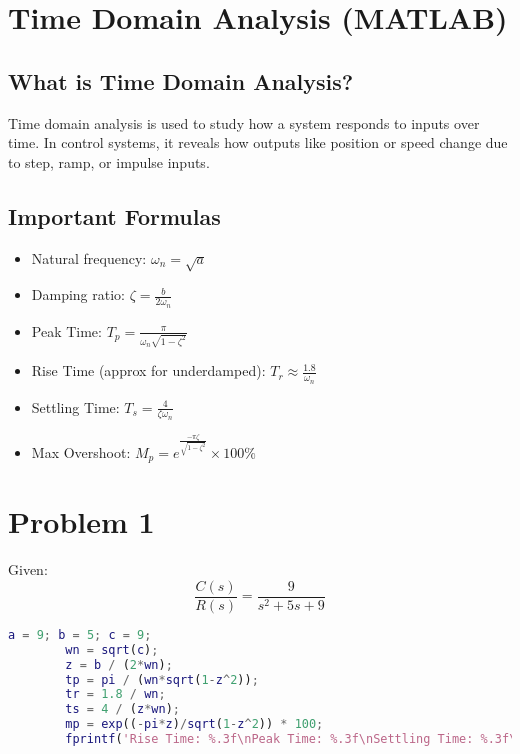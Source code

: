 \documentclass{article}
\begin{document}
	
	\section*{Time Domain Analysis (MATLAB)}
	
	\subsection*{What is Time Domain Analysis?}
	Time domain analysis is used to study how a system responds to inputs over time. In control systems, it reveals how outputs like position or speed change due to step, ramp, or impulse inputs.
	
	\subsection*{Important Formulas}
	\begin{itemize}
		\item Natural frequency: $\omega_n = \sqrt{a}$
		\item Damping ratio: $\zeta = \frac{b}{2\omega_n}$
		\item Peak Time: $T_p = \frac{\pi}{\omega_n\sqrt{1 - \zeta^2}}$
		\item Rise Time (approx for underdamped): $T_r \approx \frac{1.8}{\omega_n}$
		\item Settling Time: $T_s = \frac{4}{\zeta\omega_n}$
		\item Max Overshoot: $M_p = e^{\frac{-\pi\zeta}{\sqrt{1 - \zeta^2}}} \times 100\%$
	\end{itemize}
	
	\section*{Problem 1}
	Given:
	\[
	\frac{C(s)}{R(s)} = \frac{9}{s^2 + 5s + 9}
	\]
	
	\begin{lstlisting}[language=Matlab, caption=Time response metrics without built-in functions]
		a = 9; b = 5; c = 9;
		wn = sqrt(c);
		z = b / (2*wn);
		tp = pi / (wn*sqrt(1-z^2));
		tr = 1.8 / wn;
		ts = 4 / (z*wn);
		mp = exp((-pi*z)/sqrt(1-z^2)) * 100;
		fprintf('Rise Time: %.3f\nPeak Time: %.3f\nSettling Time: %.3f\nOvershoot: %.2f%%\n', tr, tp, ts, mp);
	\end{lstlisting}
	
\end{document}
